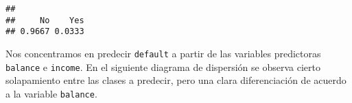 \documentclass[]{book}
\newenvironment{Shaded}{\begin{snugshade}}{\end{snugshade}}
\newcommand{\CommentTok}[1]{\textcolor[rgb]{0.56,0.35,0.01}{\textit{#1}}}
\newcommand{\KeywordTok}[1]{\textcolor[rgb]{0.13,0.29,0.53}{\textbf{#1}}}
\newcommand{\NormalTok}[1]{#1}
\newcommand{\OperatorTok}[1]{\textcolor[rgb]{0.81,0.36,0.00}{\textbf{#1}}}
\begin{document}
\begin{Shaded}
\end{Shaded}

\begin{verbatim}
## 
##     No    Yes 
## 0.9667 0.0333
\end{verbatim}

Nos concentramos en predecir \texttt{default} a partir de las variables predictoras \texttt{balance} e \texttt{income}. En el siguiente diagrama de dispersión se observa cierto solapamiento entre las clases a predecir, pero una clara diferenciación de acuerdo a la variable \texttt{balance}.
\end{document}
